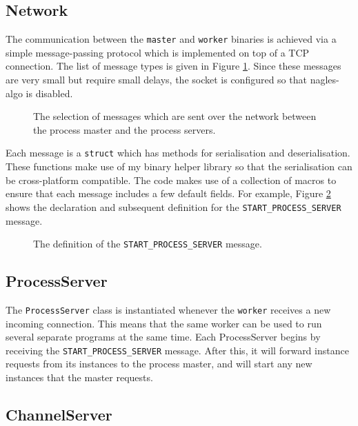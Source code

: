 \subsection{Network}

The communication between the \texttt{master} and \texttt{worker} binaries is
achieved via a simple message-passing protocol which is implemented on top of
a TCP connection. The list of message types is given in Figure
\ref{message-types}. Since these messages are very small but require small
delays, the socket is configured so that \gls{nagles-algo} is disabled.

\begin{figure}[h]
  
  \caption{
    The selection of messages which are sent over the network between the
    process master and the process servers.
  }
  \label{message-types}
\end{figure}

Each message is a \texttt{struct} which has methods for serialisation and
deserialisation. These functions make use of my binary helper library so that
the serialisation can be cross-platform compatible. The code makes use of
a collection of macros to ensure that each message includes a few default
fields. For example, Figure \ref{start-process-server} shows the declaration and
subsequent definition for the \texttt{START\_PROCESS\_SERVER} message.

\begin{figure}[h]
  
  \caption{The definition of the \texttt{START\_PROCESS\_SERVER} message.}
  \label{start-process-server}
\end{figure}

\subsection{ProcessServer}

The \texttt{ProcessServer} class is instantiated whenever the \texttt{worker}
receives a new incoming connection. This means that the same worker can be used
to run several separate programs at the same time. Each ProcessServer begins by
receiving the \texttt{START\_PROCESS\_SERVER} message. After this, it will
forward instance requests from its instances to the process master, and will
start any new instances that the master requests.

\subsection{ChannelServer}

